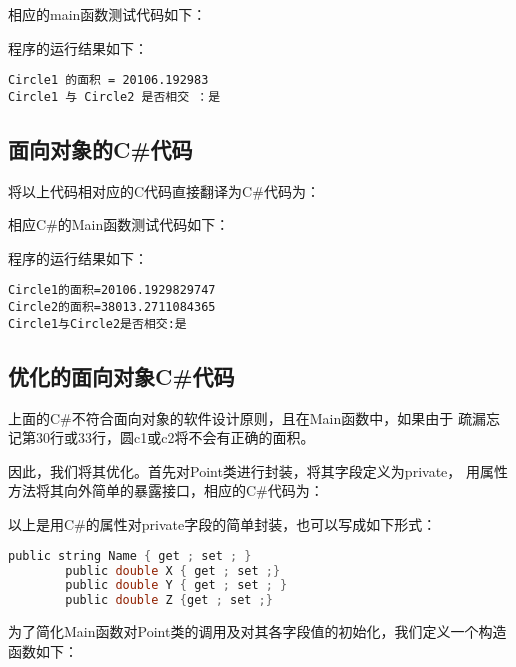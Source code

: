 相应的main函数测试代码如下：



程序的运行结果如下：
\begin{verbatim}
Circle1 的面积 = 20106.192983
Circle1 与 Circle2 是否相交 ：是
\end{verbatim}


\subsection{面向对象的C\#代码}

将以上代码相对应的C代码直接翻译为C\#代码为：




相应C\#的Main函数测试代码如下：



程序的运行结果如下：
\begin{verbatim}
Circle1的面积=20106.1929829747
Circle2的面积=38013.2711084365
Circle1与Circle2是否相交:是
\end{verbatim}

\subsection{优化的面向对象C\#代码}
上面的C\#不符合面向对象的软件设计原则，且在Main函数中，如果由于
疏漏忘记第30行或33行，圆c1或c2将不会有正确的面积。

因此，我们将其优化。首先对Point类进行封装，将其字段定义为private，
用属性方法将其向外简单的暴露接口，相应的C\#代码为：



以上是用C\#的属性对private字段的简单封装，也可以写成如下形式：
\begin{lstlisting}[language=C]
        public string Name { get ; set ; }
        public double X { get ; set ;}
        public double Y { get ; set ; }
        public double Z {get ; set ;}
\end{lstlisting}

为了简化Main函数对Point类的调用及对其各字段值的初始化，我们定义一个构造函数如下：



